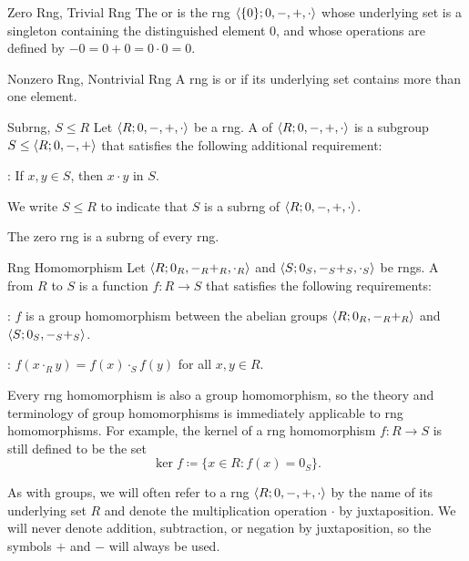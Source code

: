 \documentclass[12pt]{report}
\begin{document}
\begin{dfnbox}{Zero Rng, Trivial Rng}
	The  or  is the rng ${\langle { \{0\}; 0, -, +, \cdot } \rangle}$ whose underlying set is a singleton containing the distinguished element $0$, and whose operations are defined by $-0 = 0 + 0 = 0 \cdot 0 = 0$.
\end{dfnbox}

\begin{dfnbox}{Nonzero Rng, Nontrivial Rng}
	A rng is  or  if its underlying set contains more than one element.
\end{dfnbox}

\begin{dfnbox}{Subrng, $S \le R$}
	Let ${\langle {R; 0, -, +, \cdot} \rangle}$ be a rng. A  of ${\langle {R; 0, -, +, \cdot} \rangle}$ is a subgroup $S \le {\langle {R; 0, -, +} \rangle}$ that satisfies the following additional requirement:
	\begin{boxitems}
		\item {}: If $x, y \in S$, then $x \cdot y$ in $S$.
	\end{boxitems}
	We write $S \le R$ to indicate that $S$ is a subrng of ${\langle {R; 0, -, +, \cdot} \rangle}$.
\end{dfnbox}

The zero rng is a subrng of every rng.

\begin{dfnbox}{Rng Homomorphism}
	Let ${\langle {R; 0_R, -_R +_R, \cdot_R} \rangle}$ and ${\langle {S; 0_S, -_S +_S, \cdot_S} \rangle}$ be rngs. A  from $R$ to $S$ is a function $f: R \to S$ that satisfies the following requirements:
	\begin{boxitems}
		\item {}: $f$ is a group homomorphism between the abelian groups ${\langle {R; 0_R, -_R +_R} \rangle}$ and ${\langle {S; 0_S, -_S +_S} \rangle}$.
		\item {}: $f(x \cdot_R y) = f(x) \cdot_S f(y)$ for all $x, y \in R$.
	\end{boxitems}
\end{dfnbox}

Every rng homomorphism is also a group homomorphism, so the theory and terminology of group homomorphisms is immediately applicable to rng homomorphisms. For example, the kernel of a rng homomorphism $f: R \to S$ is still defined to be the set
\[ \ker f \coloneq \{ x \in R : f(x) = 0_S \}. \]

As with groups, we will often refer to a rng ${\langle {R; 0, -, +, \cdot} \rangle}$ by the name of its underlying set $R$ and denote the multiplication operation $\cdot$ by juxtaposition. We will never denote addition, subtraction, or negation by juxtaposition, so the symbols $+$ and $-$ will always be used.
\end{document}
